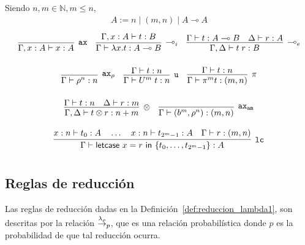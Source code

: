 \begin{definicion}
\label{def:tipado_lambda}

Siendo $n,m \in \mathbb{N}, m\leq n$,
\begin{align*}
A := n \mid (m, n) \mid A \multimap A
\end{align*}
 \[\arraycolsep=5pt\def\arraystretch{2.6}
   \begin{array}{ccc}
     \infer[\mathtt{ax}]
     {\Gamma, x : A \vdash x : A}
     {}
     &
         \infer[\multimap_i]
         {\Gamma \vdash \lambda x.t : A \multimap B}
         {\Gamma, x : A \vdash t : B}
     &
         \infer[\multimap_e]
         {\Gamma, \Delta \vdash t\;r : B}
         {\Gamma \vdash t : A \multimap B \quad \Delta \vdash r : A}
   \end{array}
 \]
 \[\arraycolsep=5pt\def\arraystretch{2.6}
   \begin{array}{ccc}
     \infer[\mathtt{ax}_\rho]
     {\Gamma \vdash \rho^n : n}
     {}
     &
         \infer[\mathtt{u}]
         {\Gamma \vdash U^m\;t : n}
         {\Gamma \vdash t : n}
     &
         \infer[\pi]
         {\Gamma \vdash \pi^m t : (m, n)}
         {\Gamma \vdash t : n}
   \end{array} 
 \]
 \[\arraycolsep=5pt\def\arraystretch{2.6}
   \begin{array}{cc}
     \infer[\otimes]
     {\Gamma, \Delta \vdash t \otimes r : n + m}
     {\Gamma \vdash t: n \quad \Delta \vdash r : m}
     &
         \infer[\mathtt{ax_{am}}]
         {\Gamma \vdash (b^m, \rho^n) : (m, n)}
         {}
   \end{array}
 \]
 \[\arraycolsep=5pt\def\arraystretch{2.6}
   \begin{array}{c}
     \infer[\mathtt{lc}]
     {\Gamma \vdash \textsf{letcase } x = r \textsf{ in  }\{t_0,\dots,t_{2^m-1}\} : A}
     {x:n\vdash t_0 : A \quad \dots\quad x:n\vdash t_{2^m-1}:A\quad \Gamma \vdash r:(m, n)}
   \end{array}
 \]

\end{definicion}

\subsection{Reglas de reducción}
Las reglas de reducción dadas en la Definición~\ref{def:reduccion_lambda1}, son descritas por la relación $\overset{\lambda_\rho}{\rightarrow}_p$, que es una relación probabilística donde $p$ es la probabilidad de que tal reducción ocurra.


